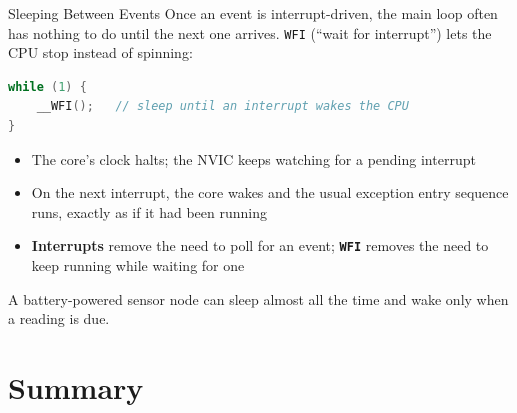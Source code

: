 \documentclass[9pt,aspectratio=169,xcolor=table]{beamer}
\begin{document}
\begin{frame}[fragile]{Sleeping Between Events}
    \leavevmode
    {\small Once an event is interrupt-driven, the main loop often has
    nothing to do until the next one arrives. \alert{\texttt{WFI}}
    (``wait for interrupt'') lets the CPU stop instead of spinning:}

    \begin{lstlisting}[language=C]
while (1) {
    __WFI();   // sleep until an interrupt wakes the CPU
}
    \end{lstlisting}

    \begin{itemize}
        \item The core's clock halts; the NVIC keeps watching for a
              pending interrupt
        \item On the next interrupt, the core wakes and the usual
              exception entry sequence runs, exactly as if it had been
              running
        \item \textbf{Interrupts} remove the need to \alert{poll} for an
              event; \textbf{\texttt{WFI}} removes the need to
              \alert{keep running} while waiting for one
    \end{itemize}

    \vspace{1mm}
    {\small A battery-powered sensor node can sleep almost all the
    time and wake only when a reading is due.}
\end{frame}


\section{Summary}
\end{document}
